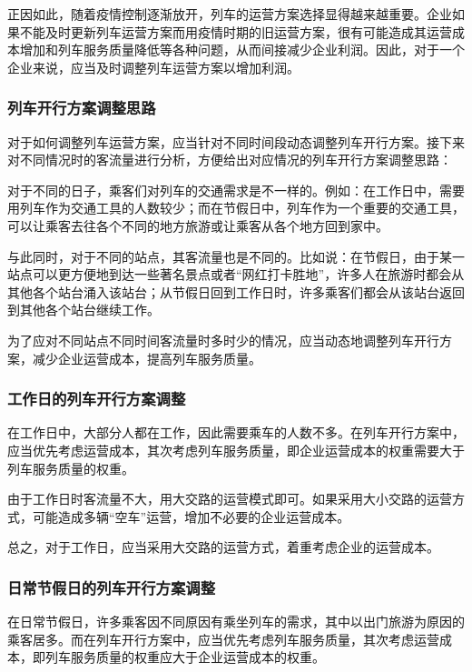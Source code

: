 正因如此，随着疫情控制逐渐放开，列车的运营方案选择显得越来越重要。企业如果不能及时更新列车运营方案而用疫情时期的旧运营方案，很有可能造成其运营成本增加和列车服务质量降低等各种问题，从而间接减少企业利润。因此，对于一个企业来说，应当及时调整列车运营方案以增加利润。

\subsubsection{列车开行方案调整思路}

对于如何调整列车运营方案，应当针对不同时间段动态调整列车开行方案。接下来对不同情况时的客流量进行分析，方便给出对应情况的列车开行方案调整思路：

对于不同的日子，乘客们对列车的交通需求是不一样的。例如：在工作日中，需要用列车作为交通工具的人数较少；而在节假日中，列车作为一个重要的交通工具，可以让乘客去往各个不同的地方旅游或让乘客从各个地方回到家中。

与此同时，对于不同的站点，其客流量也是不同的。比如说：在节假日，由于某一站点可以更方便地到达一些著名景点或者“网红打卡胜地”，许多人在旅游时都会从其他各个站台涌入该站台；从节假日回到工作日时，许多乘客们都会从该站台返回到其他各个站台继续工作。

为了应对不同站点不同时间客流量时多时少的情况，应当动态地调整列车开行方案，减少企业运营成本，提高列车服务质量。

\subsubsection{工作日的列车开行方案调整}

在工作日中，大部分人都在工作，因此需要乘车的人数不多。在列车开行方案中，应当优先考虑运营成本，其次考虑列车服务质量，即企业运营成本的权重需要大于列车服务质量的权重。

由于工作日时客流量不大，用大交路的运营模式即可。如果采用大小交路的运营方式，可能造成多辆“空车”运营，增加不必要的企业运营成本。

总之，对于工作日，应当采用大交路的运营方式，着重考虑企业的运营成本。

\subsubsection{日常节假日的列车开行方案调整}

在日常节假日，许多乘客因不同原因有乘坐列车的需求，其中以出门旅游为原因的乘客居多。而在列车开行方案中，应当优先考虑列车服务质量，其次考虑运营成本，即列车服务质量的权重应大于企业运营成本的权重。

